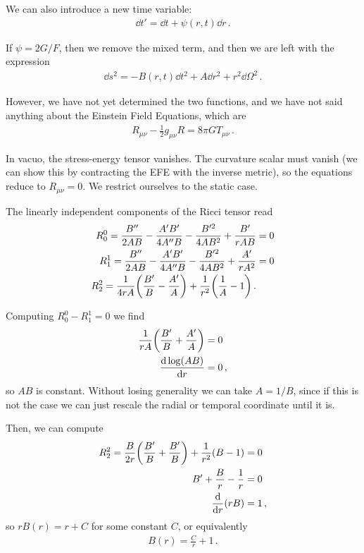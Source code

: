 \documentclass[main.tex]{subfiles}
\begin{document}
We can also introduce a new time variable: 
%
\begin{align}
\dd{t'} = \dd{t} + \psi (r, t) \dd{r} 
\,.
\end{align}

If \(\psi = 2 G / F\), then we remove the mixed term, and then we are left with the expression 
%
\begin{align}
\dd{s^2} = -B (r, t) \dd{t^2} + A \dd{r^2} + r^2 \dd{\Omega^2}
\,.
\end{align}

However, we have not yet determined the two functions, and we have not said anything about the Einstein Field Equations, which are 
%
\begin{align}
R_{\mu \nu } - \frac{1}{2} g_{\mu \nu } R = 8 \pi G T_{\mu \nu }
\,.
\end{align}

In vacuo, the stress-energy tensor vanishes. 
The curvature scalar must vanish (we can show this by contracting the EFE with the inverse metric), so the equations reduce to \(R_{\mu \nu } = 0\). 
We restrict ourselves to the static case. 

The linearly independent components of the Ricci tensor read 
%
\begin{align}
R_{0}^{0} = \frac{B''}{2AB} - \frac{A' B'}{4 A'' B}
- \frac{B^{\prime 2}}{4AB^2} + \frac{B'}{rAB} &= 0 \\
R_{1}^{1} = \frac{B''}{2AB} - \frac{A' B'}{4 A'' B}
- \frac{B^{\prime 2}}{4AB^2} + \frac{A'}{rA^2} &= 0 \\ 
R_{2}^{2} = \frac{1}{4rA} \qty(\frac{B'}{B} - \frac{A'}{A})
+ \frac{1}{r^2} \qty( \frac{1}{A} - 1)
\,.
\end{align}

Computing \(R^{0}_{0} - R^{1}_{1} = 0\) we find 
%
\begin{align}
\frac{1}{rA} \qty(\frac{B'}{B} + \frac{A'}{A} )&= 0  \\
\dv{\log (AB)}{r} &= 0
\,,
\end{align}
%
so \(AB\) is constant.
Without losing generality we can take \(A = 1/B\), since if this is not the case we can just rescale the radial or temporal coordinate until it is.

Then, we can compute 
%
\begin{align}
R^{2}_{2} = \frac{B}{2r} \qty(\frac{B'}{B} + \frac{B'}{B}) + \frac{1}{r^2} (B-1) &= 0  \\
B' + \frac{B}{r} - \frac{1}{r} &= 0  \\
\dv{}{r} \qty(rB) &= 1
\,,
\end{align}
%
so \(r B(r) = r + C\) for some constant \(C\), or equivalently 
%
\begin{align}
B (r) = \frac{C}{r} + 1
\,.
\end{align}
\end{document}
